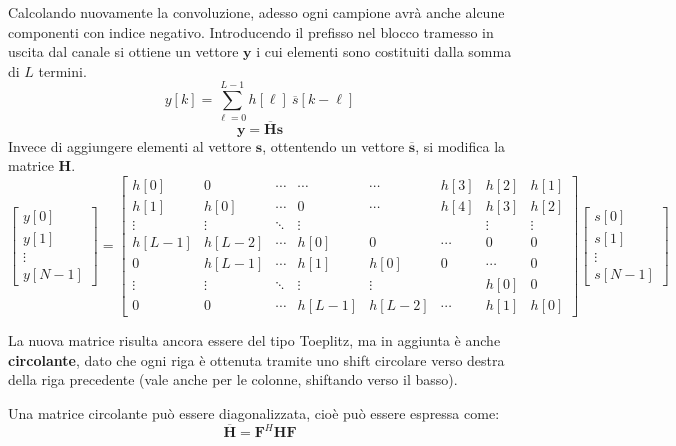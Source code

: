 Calcolando nuovamente la convoluzione, adesso ogni campione avrà anche alcune componenti con indice negativo.
Introducendo il prefisso nel blocco tramesso in uscita dal canale si ottiene un vettore $\mathbf{y}$ i cui elementi sono costituiti dalla somma di $L$ termini.
\[
    y[k] = \sum_{\ell=0}^{L-1} h[\ell] \ \overline{s}[k-\ell]
\]
\[
    \mathbf{y} = \mathbf{\overline{H}} \mathbf{s}
\]
Invece di aggiungere elementi al vettore $\mathbf{s}$, ottentendo un vettore $\mathbf{\overline{s}}$, si modifica la matrice $\mathbf{H}$.
\[ 
\begin{bmatrix} y[0] \\ y[1] \\ \vdots \\ y[N-1] \end{bmatrix} 
= 
\begin{bmatrix}
    h[0] & 0 & \cdots & \cdots & \cdots & h[3] & h[2] & h[1] \\
    h[1] & h[0] & \cdots & 0 & \cdots & h[4] & h[3] & h[2] \\
    \vdots & \vdots & \ddots & \vdots & &  & \vdots & \vdots \\
    h[L-1] & h[L-2] & \cdots & h[0] & 0 & \cdots & 0 & 0 \\
    0 & h[L-1] & \cdots & h[1] & h[0] & 0 & \cdots & 0 \\
    \vdots & \vdots & \ddots & \vdots & \vdots & & h[0] & 0 \\
    0 & 0 & \cdots & h[L-1] & h[L-2] & \cdots & h[1] & h[0]
\end{bmatrix}   
\begin{bmatrix} s[0] \\ s[1] \\ \vdots \\ s[N-1] \end{bmatrix}
\]



La nuova matrice risulta ancora essere del tipo Toeplitz, ma in aggiunta è anche \textbf{circolante}, dato che ogni riga è ottenuta tramite uno shift circolare verso destra della riga precedente (vale anche per le colonne, shiftando verso il basso).

Una matrice circolante può essere diagonalizzata, cioè può essere espressa come:
\[
    \overline{\mathbf{H}} = \mathbf{F}^H \mathbf{H} \mathbf{F}
\]




